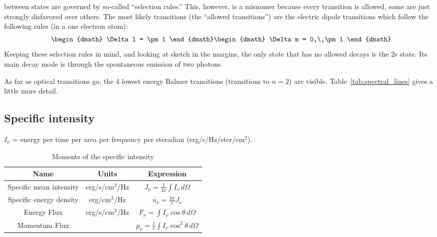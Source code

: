 \begin{enumerate}
      between states are governed by so-called ``selection rules.''
      This, however, is a misnomer because every transition is allowed, some are just strongly
      disfavored over others.  The most likely transitions (the ``allowed transitions'') are
      the electric dipole transitions which follow the following rules (in a one electron atom):
      \begin{dgroup}
      \begin{dmath}
        \Delta l = \pm 1
      \end{dmath}
      \begin{dmath}
        \Delta m = 0,\,\pm1
      \end{dmath}
      \end{dgroup}
      Keeping these selection rules in mind, and looking at sketch in the margins,
      the only state that has no allowed decays is the 2s state.  Its main decay mode is through
      the spontaneous emission of two photons.
      
      As far as optical transitions go, the 4 lowest energy Balmer transitions (transitions
      to $n=2$) are visible.  Table~\ref{tab:spectral_lines} gives a little more detail.

\end{enumerate}

\subsection{Specific intensity}
 $I_{\nu}$ = energy per time per area per frequency per
steradian (erg/s/Hz/ster/cm$^2$).

\begin{table}[ht]
\centering
\begin{tabular}{ccc}
\toprule
Name & Units & Expression \\
\midrule
Specific mean intensity & erg/s/cm$^2$/Hz &
    $J_{\nu}=\frac{1}{4\pi}\int I_{\nu}\,d\Omega$ \\
Specific energy density & erg/cm$^3$/Hz &
    $u_{\nu}=\frac{4\pi}{c}J_{\nu}$ \\
Energy Flux & erg/s/cm$^2$/Hz &
    $F_{\nu}=\int I_{\nu}\cos \theta\,d\Omega$ \\
Momentum Flux &&
    $p_{\nu}=\frac{1}{c}\int I_{\nu}\cos^2 \theta\,d\Omega$ \\
\bottomrule
\end{tabular}
\caption{Moments of the specific intensity}
\label{tab:moments}
\end{table}

